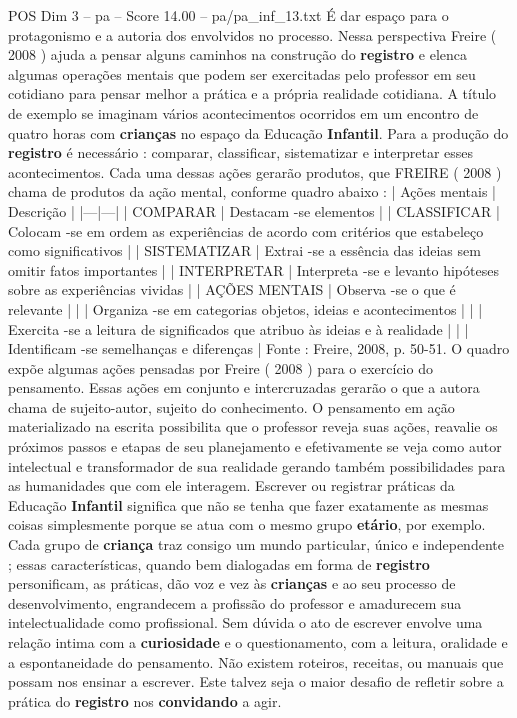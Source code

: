 \begin{textsample}{POS Dim 3 – pa – Score 14.00 – pa/pa\_inf\_13.txt}
É dar espaço para o protagonismo e a autoria dos envolvidos no processo.
Nessa perspectiva Freire ( 2008 ) ajuda a pensar alguns caminhos na construção do \textbf{registro} e elenca algumas operações mentais que podem ser exercitadas pelo professor em seu cotidiano para pensar melhor a prática e a própria realidade cotidiana.
A título de exemplo se imaginam vários acontecimentos ocorridos em um encontro de quatro horas com \textbf{crianças} no espaço da Educação \textbf{Infantil}.
Para a produção do \textbf{registro} é necessário : comparar, classificar, sistematizar e interpretar esses acontecimentos.
Cada uma dessas ações gerarão produtos, que FREIRE ( 2008 ) chama de produtos da ação mental, conforme quadro abaixo : | Ações mentais | Descrição | |---|---| | COMPARAR | Destacam -se elementos | | CLASSIFICAR | Colocam -se em ordem as experiências de acordo com critérios que estabeleço como significativos | | SISTEMATIZAR | Extrai -se a essência das ideias sem omitir fatos importantes | | INTERPRETAR | Interpreta -se e levanto hipóteses sobre as experiências vividas | | AÇÕES MENTAIS | Observa -se o que é relevante | | | Organiza -se em categorias objetos, ideias e acontecimentos | | | Exercita -se a leitura de significados que atribuo às ideias e à realidade | | | Identificam -se semelhanças e diferenças | Fonte : Freire, 2008, p. 50-51.
O quadro expõe algumas ações pensadas por Freire ( 2008 ) para o exercício do pensamento.
Essas ações em conjunto e intercruzadas gerarão o que a autora chama de sujeito-autor, sujeito do conhecimento.
O pensamento em ação materializado na escrita possibilita que o professor reveja suas ações, reavalie os próximos passos e etapas de seu planejamento e efetivamente se veja como autor intelectual e transformador de sua realidade gerando também possibilidades para as humanidades que com ele interagem.
Escrever ou registrar práticas da Educação \textbf{Infantil} significa que não se tenha que fazer exatamente as mesmas coisas simplesmente porque se atua com o mesmo grupo \textbf{etário}, por exemplo.
Cada grupo de \textbf{criança} traz consigo um mundo particular, único e independente ; essas características, quando bem dialogadas em forma de \textbf{registro} personificam, as práticas, dão voz e vez às \textbf{crianças} e ao seu processo de desenvolvimento, engrandecem a profissão do professor e amadurecem sua intelectualidade como profissional.
Sem dúvida o ato de escrever envolve uma relação intima com a \textbf{curiosidade} e o questionamento, com a leitura, oralidade e a espontaneidade do pensamento.
Não existem roteiros, receitas, ou manuais que possam nos ensinar a escrever.
Este talvez seja o maior desafio de refletir sobre a prática do \textbf{registro} nos \textbf{convidando} a agir.

\end{textsample}
